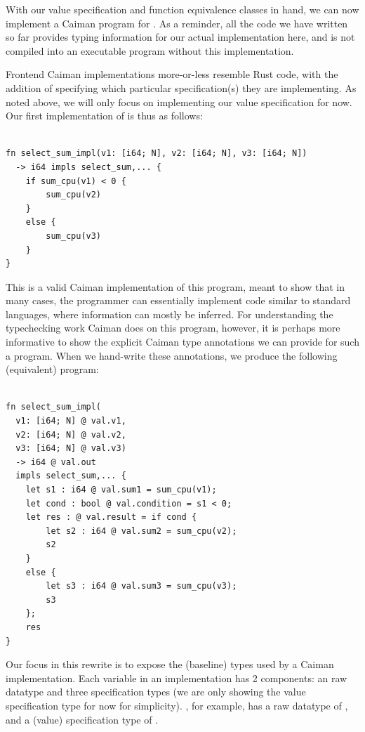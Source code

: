 With our value specification and function equivalence classes in hand, we can now implement a Caiman program for .  As a reminder, all the code we have written so far provides typing information for our actual implementation here, and is not compiled into an executable program without this implementation.

Frontend Caiman implementations more-or-less resemble Rust code, with the addition of specifying which particular specification(s) they are implementing.  As noted above, we will only focus on implementing our value specification for now.  Our first implementation of  is thus as follows:
%
\begin{lstlisting}

fn select_sum_impl(v1: [i64; N], v2: [i64; N], v3: [i64; N]) 
  -> i64 impls select_sum,... {
    if sum_cpu(v1) < 0 { 
        sum_cpu(v2)
    }
    else {
        sum_cpu(v3)
    }
}
\end{lstlisting}
%
This is a valid Caiman implementation of this program, meant to show that in many cases, the programmer can essentially implement code similar to standard languages, where information can mostly be inferred.  For understanding the typechecking work Caiman does on this program, however, it is perhaps more informative to show the explicit Caiman type annotations we can provide for such a program.  When we hand-write these annotations, we produce the following (equivalent) program:
%
\begin{lstlisting}

fn select_sum_impl(
  v1: [i64; N] @ val.v1,
  v2: [i64; N] @ val.v2,
  v3: [i64; N] @ val.v3)
  -> i64 @ val.out
  impls select_sum,... {
    let s1 : i64 @ val.sum1 = sum_cpu(v1);
    let cond : bool @ val.condition = s1 < 0;
    let res : @ val.result = if cond {
        let s2 : i64 @ val.sum2 = sum_cpu(v2);
        s2
    }
    else {
        let s3 : i64 @ val.sum3 = sum_cpu(v3);
        s3
    };
    res
}
\end{lstlisting}
%
Our focus in this rewrite is to expose the (baseline) types used by a Caiman implementation.  Each variable in an implementation has 2 components: an raw datatype and three specification types (we are only showing the value specification type for now for simplicity).  , for example, has a raw datatype of , and a (value) specification type of .

